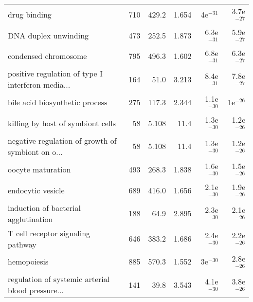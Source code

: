 \begin{longtable}{lrrrrr}
                                      drug binding &                     710 &                   429.2 &      1.654 &           4e$^{-31}$ &         3.7e$^{-27}$ \\
                              DNA duplex unwinding &                     473 &                   252.5 &      1.873 &         6.3e$^{-31}$ &         5.9e$^{-27}$ \\
                              condensed chromosome &                     795 &                   496.3 &      1.602 &         6.8e$^{-31}$ &         6.3e$^{-27}$ \\
 positive regulation of type I interferon-media... &                     164 &                    51.0 &      3.213 &         8.4e$^{-31}$ &         7.8e$^{-27}$ \\
                    bile acid biosynthetic process &                     275 &                   117.3 &      2.344 &         1.1e$^{-30}$ &           1e$^{-26}$ \\
                 killing by host of symbiont cells &                      58 &                   5.108 &       11.4 &         1.3e$^{-30}$ &         1.2e$^{-26}$ \\
 negative regulation of growth of symbiont on o... &                      58 &                   5.108 &       11.4 &         1.3e$^{-30}$ &         1.2e$^{-26}$ \\
                                 oocyte maturation &                     493 &                   268.3 &      1.838 &         1.6e$^{-30}$ &         1.5e$^{-26}$ \\
                                 endocytic vesicle &                     689 &                   416.0 &      1.656 &         2.1e$^{-30}$ &         1.9e$^{-26}$ \\
              induction of bacterial agglutination &                     188 &                    64.9 &      2.895 &         2.3e$^{-30}$ &         2.1e$^{-26}$ \\
                 T cell receptor signaling pathway &                     646 &                   383.2 &      1.686 &         2.4e$^{-30}$ &         2.2e$^{-26}$ \\
                                       hemopoiesis &                     885 &                   570.3 &      1.552 &           3e$^{-30}$ &         2.8e$^{-26}$ \\
 regulation of systemic arterial blood pressure... &                     141 &                    39.8 &      3.543 &         4.1e$^{-30}$ &         3.8e$^{-26}$ \\

\end{longtable}
